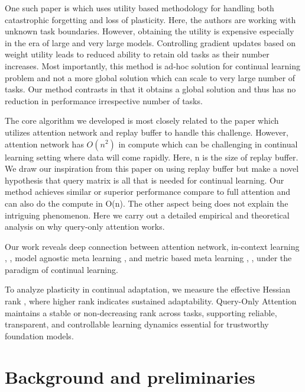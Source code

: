 \documentclass{article}
\begin{document}
One such paper is \citep{elsayed2024addressing} which uses utility based methodology for handling both catastrophic forgetting and loss of plasticity. Here, the authors are working with unknown task boundaries. However, obtaining the utility is expensive especially in the era of large and very 
large models. Controlling gradient updates based on weight utility leads to reduced ability to retain old tasks as their number increases. Most importantly, this method is ad-hoc solution for continual learning problem and not a more global solution which can scale to very large number of tasks.
Our method contrasts in that it obtains a global solution and thus has no reduction in performance irrespective number of tasks.

The core algorithm we developed is most closely related to the paper \citep{wang2025replay} which utilizes attention network and replay buffer to handle this challenge. However, attention network has $O(n^2)$ in compute which can be challenging in continual learning setting where data will come rapidly.  Here, n is the size of replay buffer. 
We draw our inspiration from this paper on using replay buffer but make a novel hypothesis that query matrix is all that is needed for continual learning. Our method achieves similar or superior performance compare to full attention and can also do the compute in O(n).
The other aspect being \citep{wang2025replay}  does not explain the intriguing phenomenon.
Here we carry out a detailed empirical and theoretical analysis on why query-only attention works.

Our work reveals  deep connection between attention network, in-context learning \citep{dong2024survey}, \citep{wu2025why}, \citep{ahn2023transformers} model agnostic meta learning \citep{finn2017maml}, and metric based meta learning \citep{vinyals2016matching}, \citep{koch2015siamese}, \citep{snell2017prototypical} under the paradigm of continual learning.

To analyze plasticity in continual adaptation, we measure the effective Hessian rank \citep{lewandowski2023curvature, roy2007effective}, where higher rank indicates sustained adaptability. Query-Only Attention maintains a stable or non-decreasing rank across tasks, supporting reliable, transparent, and controllable learning dynamics essential for trustworthy foundation models.

\section{Background and preliminaries}
\end{document}
